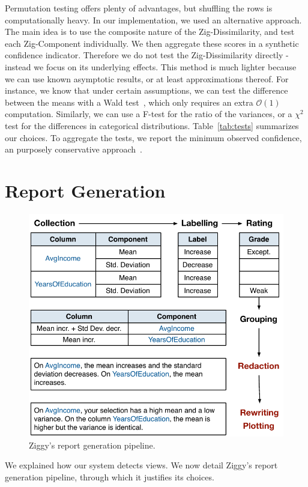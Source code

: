 Permutation testing offers plenty of advantages, but shuffling the rows is
computationally heavy. In our implementation, we used an alternative approach.
The main idea is to use the composite nature of the Zig-Dissimilarity, and test
each Zig-Component individually. We then aggregate these scores in a synthetic
confidence indicator. Therefore we do not test the Zig-Dissimilarity directly -
instead we focus on its underlying effects.  This method is much lighter
because we can use known asymptotic results, or at least approximations
thereof. For instance, we know that under certain assumptions, we can test the
difference between the means with a Wald test~\cite{wasserman2013all}, which
only requires an extra $\mathcal{O}(1)$ computation.  Similarly, we can use a
F-test for the ratio of the variances, or a $\chi^2$ test for the differences
in categorical distributions.  Table~\ref{tab:tests} summarizes our choices. 
To aggregate the tests, we report the minimum observed confidence, an purposely
conservative approach~\cite{wasserman2013all}.

\section{Report Generation}
\label{sec:reporting}
\begin{figure}[t!]
  \centering
  \includegraphics[width=0.95\columnwidth]{Figures/ReportGeneration}
  \caption{Ziggy's report generation pipeline.}
  \label{pic:reportpipeline}
\end{figure}
We explained how our system detects views. We now detail Ziggy's report generation
pipeline, through which it justifies its choices. 

